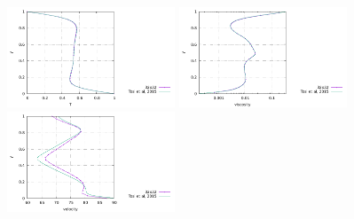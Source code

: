 \begin{center}
\includegraphics[width=5cm]{python_codes/fieldstone_28/results_case4/T_profile.pdf}
\includegraphics[width=5cm]{python_codes/fieldstone_28/results_case4/eta_profile.pdf}
\includegraphics[width=5cm]{python_codes/fieldstone_28/results_case4/V_profile.pdf}
\end{center}

